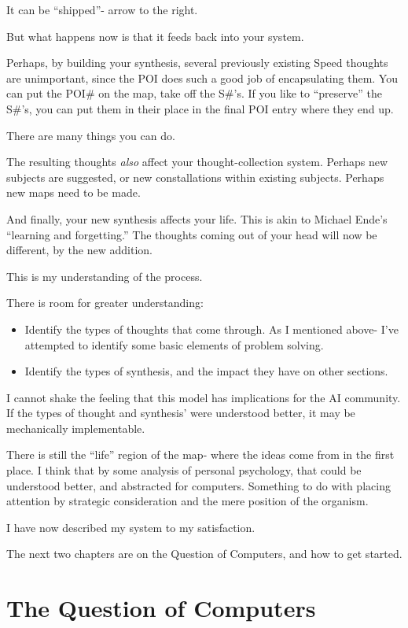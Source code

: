\documentclass[oneside]{book}
\begin{document}
It can be ``shipped''- arrow to the right.

But what happens now is that it feeds back into your system.

Perhaps, by building your synthesis, several previously existing Speed
thoughts are unimportant, since the POI does such a good job of
encapsulating them. You can put the POI\# on the map, take off the
S\#'s. If you like to ``preserve'' the S\#'s, you can put them in their
place in the final POI entry where they end up.

There are many things you can do.

The resulting thoughts \emph{also} affect your thought-collection
system. Perhaps new subjects are suggested, or new constallations
within existing subjects. Perhaps new maps need to be made.

And finally, your new synthesis affects your life. This is akin to
Michael Ende's ``learning and forgetting.'' The thoughts coming out of
your head will now be different, by the new addition.

This is my understanding of the process.

There is room for greater understanding:
\begin{itemize}
\item Identify the types of thoughts that come through. As I mentioned
above- I've attempted to identify some basic elements of problem
solving.
\item Identify the types of synthesis, and the impact they have on other
sections.
\end{itemize}

I cannot shake the feeling that this model has implications for the AI
community. If the types of thought and synthesis' were understood
better, it may be mechanically implementable.

There is still the ``life'' region of the map- where the ideas come from
in the first place. I think that by some analysis of personal
psychology, that could be understood better, and abstracted for
computers. Something to do with placing attention by strategic
consideration and the mere position of the organism.

I have now described my system to my satisfaction.

The next two chapters are on the Question of Computers, and how to get
started.

\chapter{The Question of Computers}
\end{document}
